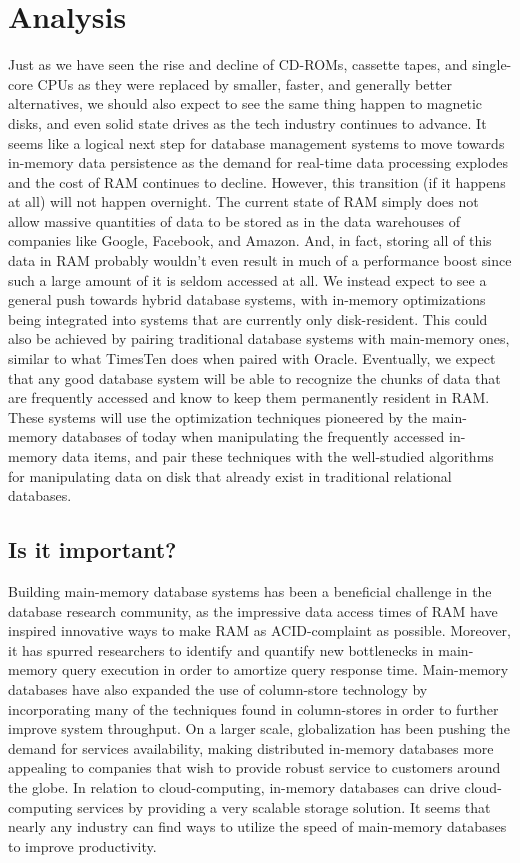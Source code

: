 \documentclass[11pt,a4paper]{report}
\begin{document}
\section{Analysis}
Just as we have seen the rise and decline of CD-ROMs, cassette tapes, and single-core CPUs as they were replaced by smaller, faster, and generally better alternatives, we should also expect to see the same thing happen to magnetic disks, and even solid state drives as the tech industry continues to advance. It seems like a logical next step for database management systems to move towards in-memory data persistence as the demand for real-time data processing explodes and the cost of RAM continues to decline. However, this transition (if it happens at all) will not happen overnight. The current state of RAM simply does not allow massive quantities of data to be stored as in the data warehouses of companies like Google, Facebook, and Amazon. And, in fact, storing all of this data in RAM probably wouldn't even result in much of a performance boost since such a large amount of it is seldom accessed at all. We instead expect to see a general push towards hybrid database systems, with in-memory optimizations being integrated into systems that are currently only disk-resident. This could also be achieved by pairing traditional database systems with main-memory ones, similar to what TimesTen does when paired with Oracle. Eventually, we expect that any good database system will be able to recognize the chunks of data that are frequently accessed and know to keep them permanently resident in RAM. These systems will use the optimization techniques pioneered by the main-memory databases of today when manipulating the frequently accessed in-memory data items, and pair these techniques with the well-studied algorithms for manipulating data on disk that already exist in traditional relational databases.

\subsection{Is it important?}
Building main-memory database systems has been a beneficial challenge in the database research community, as the impressive data access times of RAM have inspired innovative ways to make RAM as ACID-complaint as possible. Moreover, it has spurred researchers to identify and quantify new bottlenecks in main-memory query execution in order to amortize query response time. \cite{ross2004selection} Main-memory databases have also expanded the use of column-store technology by incorporating many of the techniques found in column-stores in order to further improve system throughput.\cite{exasolwp} On a larger scale, globalization has been pushing the demand for services availability, making distributed in-memory databases more appealing to companies that wish to provide robust service to customers around the globe.\cite{gartnerimdb2} In relation to cloud-computing, in-memory databases can drive cloud-computing services by providing a very scalable storage solution. \cite{ousterhout2010case} It seems that nearly any industry can find ways to utilize the speed of main-memory databases to improve productivity.
\end{document}
